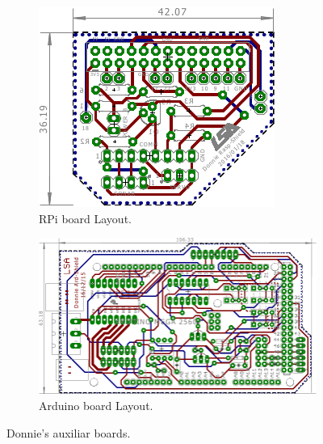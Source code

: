 \begin{figure}[h!]
    \centering
    \begin{subfigure}[b]{0.60\linewidth}
        \includegraphics[width=\linewidth]{figs/rasp_shield_v1_eagle_brd.pdf}
        \caption{RPi board Layout.}
    \end{subfigure} %
    \begin{subfigure}[b]{0.85\linewidth}
        \includegraphics[width=\linewidth]{figs/arduino_shield_v1_eagle_brd.pdf}
        \caption{Arduino board Layout.}
    \end{subfigure}
    \caption{Donnie's auxiliar boards.}
    \label{fig:donnie-boards}
\end{figure}



